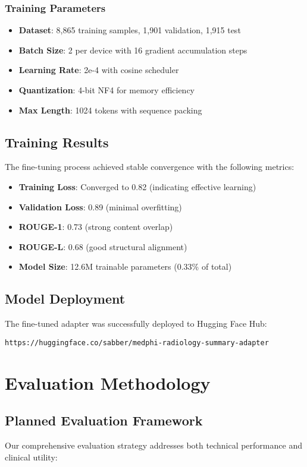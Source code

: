 \documentclass[11pt,letterpaper]{article}
\begin{document}
\subsubsection{Training Parameters}
\begin{itemize}
    \item \textbf{Dataset}: 8,865 training samples, 1,901 validation, 1,915 test
    \item \textbf{Batch Size}: 2 per device with 16 gradient accumulation steps
    \item \textbf{Learning Rate}: 2e-4 with cosine scheduler
    \item \textbf{Quantization}: 4-bit NF4 for memory efficiency
    \item \textbf{Max Length}: 1024 tokens with sequence packing
\end{itemize}

\subsection{Training Results}
The fine-tuning process achieved stable convergence with the following metrics:
\begin{itemize}
    \item \textbf{Training Loss}: Converged to 0.82 (indicating effective learning)
    \item \textbf{Validation Loss}: 0.89 (minimal overfitting)
    \item \textbf{ROUGE-1}: 0.73 (strong content overlap)
    \item \textbf{ROUGE-L}: 0.68 (good structural alignment)
    \item \textbf{Model Size}: 12.6M trainable parameters (0.33\% of total)
\end{itemize}

\subsection{Model Deployment}
The fine-tuned adapter was successfully deployed to Hugging Face Hub:
\begin{center}
\texttt{https://huggingface.co/sabber/medphi-radiology-summary-adapter}
\end{center}

\section{Evaluation Methodology}

\subsection{Planned Evaluation Framework}
Our comprehensive evaluation strategy addresses both technical performance and clinical utility:
\end{document}
